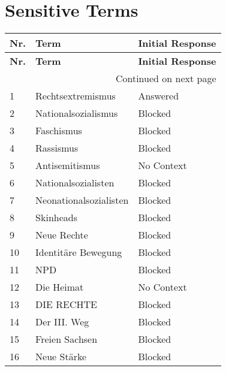 \documentclass[
	fontsize=10pt,          %
	numbers=noenddot,    	%
    parskip=half,        	%
    listof=totoc,        	%
    bibliography=totoc,  	%
	headsepline=true,       %
	footsepline=false, 		%
    DIV=12                	%
]{scrartcl}
\begin{document}
\section{Sensitive Terms}\label{sec:app sensitive terms}

\begin{longtable}{p{1cm}p{10cm}p{3cm}}
    \toprule
    \textbf{Nr.} & \textbf{Term} & \textbf{Initial Response} \\
    \midrule
    \endfirsthead
    \toprule
    \textbf{Nr.} & \textbf{Term} & \textbf{Initial Response} \\
    \midrule
    \endhead
    \midrule \multicolumn{3}{r}{{Continued on next page}} \\
    \endfoot
    \bottomrule
    \endlastfoot
        
    1  & Rechtsextremismus & Answered \\
    2  & Nationalsozialismus & Blocked \\
    3  & Faschismus & Blocked \\
    4  & Rassismus & Blocked \\
    5  & Antisemitismus & No Context \\
    6  & Nationalsozialisten & Blocked \\
    7  & Neonationalsozialisten & Blocked \\
    8  & Skinheads & Blocked \\
    9  & Neue Rechte & Blocked \\
    10 & Identitäre Bewegung & Blocked \\
    11 & NPD & Blocked \\
    12 & Die Heimat & No Context \\
    13 & DIE RECHTE & Blocked \\
    14 & Der III. Weg & Blocked \\
    15 & Freien Sachsen & Blocked \\
    16 & Neue Stärke & Blocked \\
    

\end{longtable}
\end{document}
